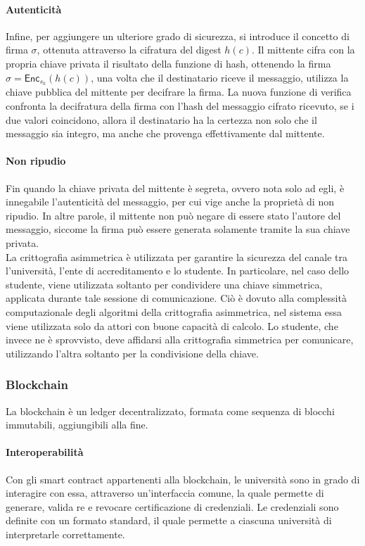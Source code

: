\documentclass[a4paper,12pt]{article}
\begin{document}
\paragraph{Autenticità}
Infine, per aggiungere un ulteriore grado di sicurezza, si introduce il concetto di firma $\sigma$, ottenuta attraverso la cifratura del digest $h(c)$. 
Il mittente cifra con la propria chiave privata il risultato della funzione di hash, ottenendo la firma $\sigma=\mathsf{Enc}_{s_k}(h(c))$, una volta che il destinatario riceve il messaggio, utilizza la chiave pubblica del mittente per decifrare la firma. La nuova funzione di verifica confronta la decifratura della firma con l'hash del messaggio cifrato ricevuto, se i due valori coincidono, allora il destinatario ha la certezza non solo che il messaggio sia integro, ma anche che provenga effettivamente dal mittente.
\paragraph{Non ripudio}
Fin quando la chiave privata del mittente è segreta, ovvero nota solo ad egli, è innegabile l'autenticità del messaggio, per cui vige anche la proprietà di non ripudio. In altre parole, il mittente non può negare di essere stato l'autore del messaggio, siccome la firma può essere generata solamente tramite la sua chiave privata.
\\[1em] La crittografia asimmetrica è utilizzata per garantire la sicurezza del canale tra l'università, l'ente di accreditamento e lo studente. In particolare, nel caso dello studente, viene utilizzata soltanto per condividere una chiave simmetrica, applicata durante tale sessione di comunicazione. Ciò è dovuto alla complessità computazionale degli algoritmi della crittografia asimmetrica, nel sistema essa viene utilizzata solo da attori con buone capacità di calcolo. 
Lo studente, che invece ne è sprovvisto, deve affidarsi alla crittografia simmetrica per comunicare, utilizzando l'altra soltanto per la condivisione della chiave.
\subsubsection{Blockchain}
La blockchain è un ledger decentralizzato, formata come sequenza di blocchi immutabili, aggiungibili alla fine.
\paragraph{Interoperabilità} 
Con gli smart contract appartenenti alla blockchain, le università sono in grado di interagire con essa, attraverso un'interfaccia comune, la quale permette di generare, valida re e revocare certificazione di credenziali. 
Le credenziali sono definite con un formato standard, il quale permette a ciascuna università di interpretarle correttamente.
\end{document}

